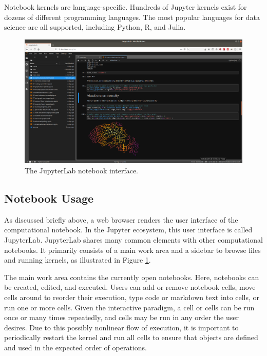 \documentclass[11pt,letterpaper]{article}
\begin{document}
Notebook kernels are language-specific. Hundreds of Jupyter kernels exist for dozens of different programming languages. The most popular languages for data science are all supported, including Python, R, and Julia.

\begin{figure}[tbp]
	\centering
	\includegraphics[width=1\textwidth]{jupyterlab-interface.png}
	\caption{The JupyterLab notebook interface.}
	\label{fig:jupyterlab_interface}
\end{figure}

\subsection{Notebook Usage}

As discussed briefly above, a web browser renders the user interface of the computational notebook. In the Jupyter ecosystem, this user interface is called JupyterLab. JupyterLab shares many common elements with other computational notebooks. It primarily consists of a main work area and a sidebar to browse files and running kernels, as illustrated in Figure \ref{fig:jupyterlab_interface}. 

The main work area contains the currently open notebooks. Here, notebooks can be created, edited, and executed. Users can add or remove notebook cells, move cells around to reorder their execution, type code or markdown text into cells, or run one or more cells. Given the interactive paradigm, a cell or cells can be run once or many times repeatedly, and cells may be run in any order the user desires. Due to this possibly nonlinear flow of execution, it is important to periodically restart the kernel and run all cells to ensure that objects are defined and used in the expected order of operations.
\end{document}
